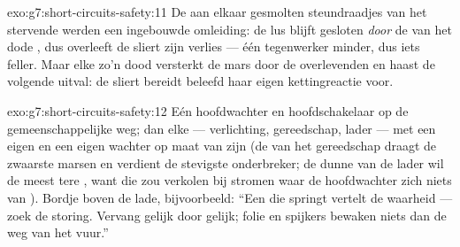 \begin{solution}{exo:g7:short-circuits-safety:11}
De aan elkaar gesmolten steundraadjes van het stervende
 werden een ingebouwde omleiding: de lus blijft gesloten
\emph{door} de  van het dode , dus overleeft de
sliert zijn verlies --- één tegenwerker minder, dus iets feller. Maar
elke zo'n dood versterkt de mars door de overlevenden en haast de
volgende uitval: de sliert bereidt beleefd haar eigen kettingreactie
voor.
\end{solution}

\begin{solution}{exo:g7:short-circuits-safety:12}
Eén hoofdwachter en hoofdschakelaar op de gemeenschappelijke weg; dan
elke  --- verlichting, gereedschap, lader --- met een eigen
 en een eigen wachter op maat van zijn  (de
 van het gereedschap draagt de zwaarste marsen en verdient de
stevigste onderbreker; de dunne  van de lader wil de meest
tere , want die zou verkolen bij stromen waar de hoofdwachter
zich niets van ). Bordje boven de lade, bijvoorbeeld: ``Een
 die springt vertelt de waarheid --- zoek de storing. Vervang
gelijk door gelijk; folie en spijkers bewaken niets dan de weg van het
vuur.''
\end{solution}

